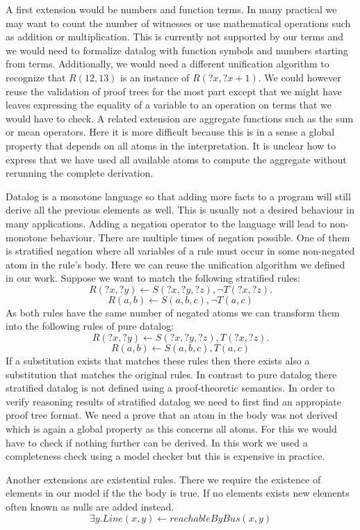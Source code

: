 A first extension would be numbers and function terms. In many practical we may want to count the number of witnesses or use mathematical operations such as addition or multiplication. This is currently not supported by our terms and we would need to formalize datalog with function symbols and numbers starting from terms. Additionally, we would need a different unification algorithm to recognize that $R(12, 13)$ is an instance of $R(?x, ?x + 1)$. We could however reuse the validation of proof trees for the most part except that we might have leaves expressing the equality of a variable to an operation on terms that we would have to check. A related extension are aggregate functions such as the sum or mean operators. Here it is more difficult because this is in a sense a global property that depends on all atoms in the interpretation. It is unclear how to express that we have used all available atoms to compute the aggregate without rerunning the complete derivation.


Datalog is a monotone language so that adding more facts to a program will still derive all the previous elements as well. This is usually not a desired behaviour in many applications. Adding a negation operator to the language will lead to non-monotone behaviour. There are multiple times of negation possible. One of them is stratified negation where all variables of a rule must occur in some non-negated atom in the rule's body. Here we can reuse the unification algorithm we defined in our work. Suppose we want to match the following stratified rules: 
    \[ R(?x,?y) \leftarrow S(?x, ?y, ?z), \neg T(?x, ?z). \]
    \[ R(a,b) \leftarrow S(a, b, c), \neg T(a, c) \]
As both rules have the same number of negated atoms we can transform them into the following rules of pure datalog:
    \[ R(?x,?y) \leftarrow S(?x, ?y, ?z), T(?x, ?z). \]
    \[ R(a,b) \leftarrow S(a, b, c), T(a, c) \]
If a substitution exists that matches these rules then there exists also a substitution that matches the original rules. In contrast to pure datalog there stratified datalog is not defined using a proof-theoretic semantics\cite{alice}. In order to verify reasoning results of stratified datalog we need to first find an appropiate proof tree format. We need a prove that an atom in the body was not derived which is again a global property as this concerns all atoms. For this we would have to check if nothing further can be derived. In this work we used a completeness check using a model checker but this is expensive in practice. 

Another extensions are existential rules. There we require the existence of elements in our model if the the body is true. If no elements exists new elements often known as nulls are added instead.
\[ \exists y. Line(x,y) \leftarrow reachableByBus(x,y)\]

